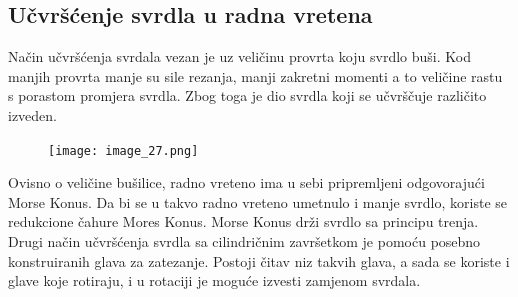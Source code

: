 \documentclass[a4paper,12pt]{article}
\numberwithin{figure}{section}
\begin{document}
\subsection{Učvršćenje svrdla u radna vretena}
Način učvršćenja svrdala vezan je uz veličinu provrta koju svrdlo buši. Kod manjih provrta manje su sile rezanja, manji zakretni momenti a to veličine rastu s porastom promjera svrdla. Zbog toga je dio svrdla koji se učvrščuje različito izveden.
\begin{figure}[!h]
\centering
\texttt{[image: image\_27.png]}
\end{figure}
\FloatBarrier
Ovisno o veličine bušilice, radno vreteno ima u sebi pripremljeni odgovorajući Morse Konus. Da bi se u takvo radno vreteno umetnulo i manje svrdlo, koriste se redukcione čahure Mores Konus. Morse Konus drži svrdlo sa principu trenja. Drugi način učvršćenja svrdla sa cilindričnim završetkom je pomoću posebno konstruiranih glava za zatezanje. Postoji čitav niz takvih glava, a sada se koriste i glave koje rotiraju, i u rotaciji je moguće izvesti zamjenom svrdala.
\end{document}
